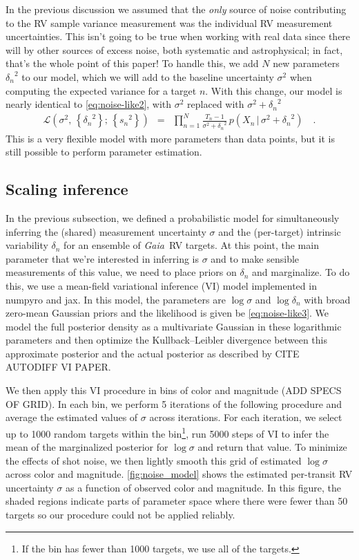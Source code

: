 \documentclass[modern, letterpaper]{aastex63}
\newcommand{\package}[1]{\textsf{#1}}
\newcommand{\project}[1]{\textsl{#1}}
\newcommand{\Gaia}{\project{Gaia}}
\begin{document}
In the previous discussion we assumed that the \emph{only} source of noise contributing to the RV sample variance measurement was the individual RV measurement uncertainties.
This isn't going to be true when working with real data since there will by other sources of excess noise, both systematic and astrophysical; in fact, that's the whole point of this paper!
To handle this, we add $N$ new parameters ${\delta_n}^2$ to our model, which we will add to the baseline uncertainty $\sigma^2$ when computing the expected variance for a target $n$.
With this change, our model is nearly identical to \autoref{eq:noise-like2}, with $\sigma^2$ replaced with $\sigma^2 + {\delta_n}^2$
\begin{eqnarray}
	\label{eq:noise-like3}
	\mathcal{L}(\sigma^2,\,\left\{{\delta_n}^2\right\};\,\left\{{s_n}^2\right\}) &=& \prod_{n=1}^N \frac{T_n - 1}{\sigma^2 + {\delta_n}^2}\,p(X_n\,|\,\sigma^2 + {\delta_n}^2) \quad.
\end{eqnarray}
This is a very flexible model with more parameters than data points, but it is still possible to perform parameter estimation.

\subsection{Scaling inference}

In the previous subsection, we defined a probabilistic model for simultaneously inferring the (shared) measurement uncertainty $\sigma$ and the (per-target) intrinsic variability $\delta_n$ for an ensemble of \Gaia\ RV targets.
At this point, the main parameter that we're interested in inferring is $\sigma$ and to make sensible measurements of this value, we need to place priors on $\delta_n$ and marginalize.
To do this, we use a mean-field variational inference (VI) model implemented in \package{numpyro} and \package{jax}.
In this model, the parameters are $\log \sigma$ and $\log \delta_n$ with broad zero-mean Gaussian priors and the likelihood is given be \autoref{eq:noise-like3}.
We model the full posterior density as a multivariate Gaussian in these logarithmic parameters and then optimize the Kullback--Leibler divergence between this approximate posterior and the actual posterior as described by CITE AUTODIFF VI PAPER.

We then apply this VI procedure in bins of color and magnitude (ADD SPECS OF GRID).
In each bin, we perform 5 iterations of the following procedure and average the estimated values of $\sigma$ across iterations.
For each iteration, we select up to 1000 random targets within the bin\footnote{If the bin has fewer than 1000 targets, we use all of the targets.}, run 5000 steps of VI to infer the mean of the marginalized posterior for $\log \sigma$ and return that value.
To minimize the effects of shot noise, we then lightly smooth this grid of estimated $\log \sigma$ across color and magnitude.
\autoref{fig:noise_model} shows the estimated per-transit RV uncertainty $\sigma$ as a function of observed color and magnitude.
In this figure, the shaded regions indicate parts of parameter space where there were fewer than 50 targets so our procedure could not be applied reliably.
\end{document}
